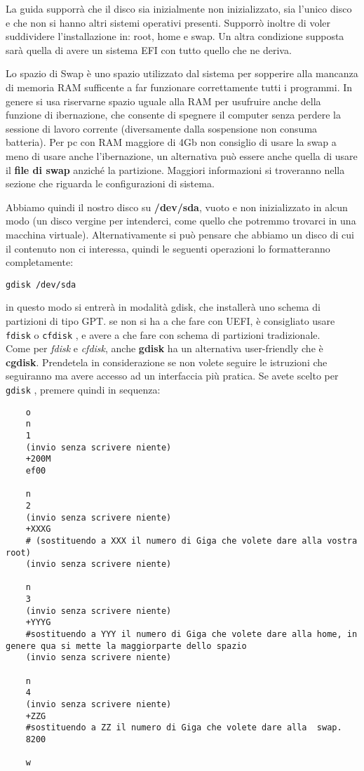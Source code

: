 \documentclass[twoside,italian]{book}
\newcommand{\centcode}[1]{
	
	\definecolor{centcode}{rgb}{0.5,0.1,0.1}
	
	\begin{center}
	 	\texttt{\textcolor{centcode}{#1}}
	\end{center}
	
	
}
\newcommand{\code}[1]{
	\texttt{\textcolor{code}{#1}}
}
\begin{document}
			La guida supporrà che il disco sia inizialmente non inizializzato, sia l'unico disco e che non si hanno altri sistemi operativi presenti. Supporrò inoltre di voler suddividere l'installazione in: root, home e swap. Un altra condizione supposta sarà quella di avere un sistema EFI con tutto quello che ne deriva.\\
			
					
			\begin{tcolorbox}[floatplacement=b,width=\textwidth,colback=fsuggerimento,colbacktitle=bsuggerimento,coltitle=fsuggerimento, colupper=bsuggerimento,title={SUGGERIMENTO}]
				 Lo spazio di Swap è uno spazio utilizzato dal sistema per sopperire alla mancanza di memoria RAM sufficente a far funzionare correttamente tutti i programmi. In genere si usa riservarne spazio uguale alla RAM per usufruire anche della funzione di ibernazione, che consente di spegnere il computer senza perdere la sessione di lavoro corrente (diversamente dalla sospensione non consuma batteria). Per pc con RAM maggiore di 4Gb non consiglio di usare la swap a meno di usare anche l'ibernazione, un alternativa può essere anche quella di usare il \textbf{file di swap} anziché la partizione. Maggiori informazioni si troveranno nella sezione che riguarda le configurazioni di sistema.
			\end{tcolorbox}


			Abbiamo quindi il nostro disco su \textbf{/dev/sda}, vuoto e non inizializzato in alcun modo (un disco vergine per intenderci, come quello che potremmo trovarci in una macchina virtuale). Alternativamente si può pensare che abbiamo un disco  di cui il contenuto non ci interessa, quindi le seguenti operazioni lo formatteranno completamente: \centcode{gdisk /dev/sda}
			in questo modo si entrerà in modalità gdisk, che installerà uno schema di partizioni di tipo GPT. se non si ha a che fare con UEFI, è consigliato usare \code{fdisk} o \code{cfdisk}, e avere a che fare con schema di partizioni tradizionale.\\
			Come per \textit{fdisk} e \textit{cfdisk}, anche \textbf{gdisk} ha un alternativa user-friendly che è \textbf{cgdisk}. Prendetela in considerazione se non volete seguire le istruzioni che seguiranno ma avere accesso ad un interfaccia più pratica.
			Se avete scelto per \code{gdisk}, premere quindi in sequenza:\\

\begin{lstlisting}
	o
	n
	1
	(invio senza scrivere niente)
	+200M
	ef00

	n
	2
	(invio senza scrivere niente)
	+XXXG
	# (sostituendo a XXX il numero di Giga che volete dare alla vostra root)
	(invio senza scrivere niente)

	n
	3
	(invio senza scrivere niente)
	+YYYG
	#sostituendo a YYY il numero di Giga che volete dare alla home, in genere qua si mette la maggiorparte dello spazio
	(invio senza scrivere niente)

	n
	4
	(invio senza scrivere niente)
	+ZZG
	#sostituendo a ZZ il numero di Giga che volete dare alla  swap.
	8200

	w
\end{lstlisting}
\end{document}
